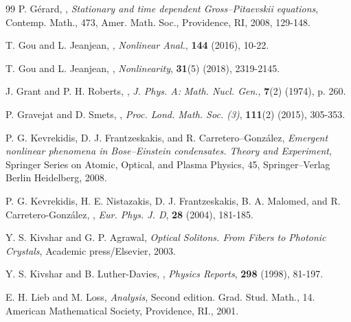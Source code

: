 \documentclass[11pt]{article}
\theoremstyle{plain}
\theoremstyle{definition}
\theoremstyle{remark}
\numberwithin{equation}{section}
\begin{document}
{\begin{thebibliography}{99}
\newblock P. G\'erard,
,
\newblock \emph{Stationary and time dependent Gross--Pitaevskii equations}, Contemp. Math., 473, Amer. Math. Soc., Providence, RI, 2008, 129-148.

\newblock T. Gou and L. Jeanjean,
,
\newblock \emph{Nonlinear Anal.}, \textbf{144} (2016), 10-22.

\newblock T. Gou and L. Jeanjean,
,
\newblock \emph{Nonlinearity}, \textbf{31}(5) (2018), 2319-2145.

\newblock J. Grant and P. H. Roberts,
,
\newblock \emph{J. Phys. A: Math. Nucl. Gen.}, \textbf{7}(2) (1974), p. 260.

\newblock P. Gravejat and D. Smets,
,
\newblock \emph{Proc. Lond. Math. Soc. (3)}, \textbf{111}(2) (2015), 305-353.

\newblock P. G. Kevrekidis, D. J. Frantzeskakis, and R. Carretero--Gonz\'alez,
\newblock \emph{Emergent nonlinear phenomena in Bose--Einstein condensates. Theory and Experiment}, Springer Series on Atomic, Optical, and Plasma Physics, 45, Springer--Verlag Berlin Heidelberg, 2008.

\newblock P. G. Kevrekidis, H. E. Nistazakis, D. J. Frantzeskakis, B. A. Malomed, and R. Carretero-Gonz\'alez,
,
\newblock \emph{Eur. Phys. J. D}, \textbf{28} (2004), 181-185.

\newblock Y. S. Kivshar and G. P. Agrawal,
\newblock \emph{Optical Solitons. From Fibers to Photonic Crystals}, Academic press/Elsevier, 2003.

\newblock Y. S. Kivshar and B. Luther-Davies,
,
\newblock \emph{Physics Reports}, \textbf{298} (1998), 81-197.

\newblock E. H. Lieb and M. Loss,
\newblock \emph{Analysis}, Second edition. Grad. Stud. Math., 14. American Mathematical Society, Providence, RI., 2001.


\end{thebibliography}}
\end{document}

